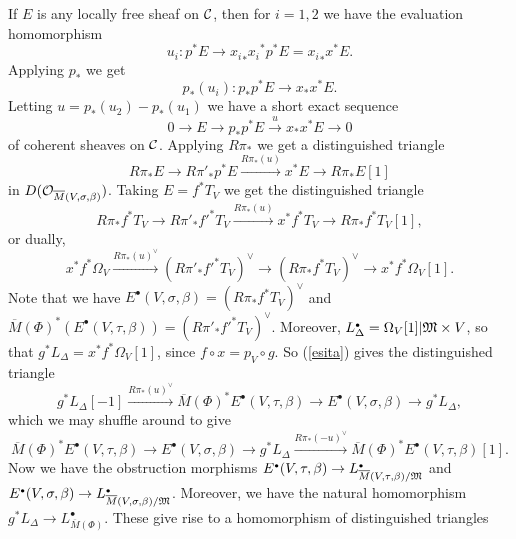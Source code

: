 \documentclass{article}
\newcommand{\dual}[1]{{{#1}^{\vee}}}
\newcommand{\upst}{^{\ast}}
\newcommand{\lst}{_{\ast}}
\newcommand{\com}{^{\scriptscriptstyle\bullet}}
\newcommand{\MM}{{\frak M}}
\renewcommand{\O}{{\cal O}}
\newcommand{\cC}{{\cal C}}
\newcommand{\resto}{{ \mid }}
\newcommand{\comp}{\mathbin{{\scriptstyle\circ}}}
\newcommand{\ol}{\overline}
\newcommand{\ses}[5]%
{0\longrightarrow#1\stackrel{#2}{ \longrightarrow}#3\stackrel{#4}{
\longrightarrow}#5\longrightarrow0}
\newcommand{\dt}[6]%
{#1\stackrel{#2}{\longrightarrow}#3 \stackrel{#4}{\longrightarrow}#5
\stackrel{#6}{\longrightarrow} #1[1]}
\begin{document}
If $E$ is any locally free sheaf on $\cC$, then for $i=1,2$ we have
the evaluation homomorphism
\[u_i:p\upst E\longrightarrow {x_i}\lst{x_i}\upst p\upst E = {x_i}\lst
x\upst E.\]
Applying $p\lst$ we get
\[p\lst(u_i):p\lst p\upst E\longrightarrow x\lst x\upst E.\]
Letting $u=p\lst(u_2)-p\lst(u_1)$ we have a short exact sequence
\[\ses{E}{}{p\lst p\upst E}{u}{x\lst x\upst E}\]
of coherent sheaves on $\cC$. Applying $R\pi\lst$ we get a
distinguished triangle
\[\dt{R\pi\lst E}{}{ R\pi'\lst p\upst E}{R\pi\lst(u)}{x\upst E}{}\]
in $D(\O_{\ol{M}(V,\sigma,\beta)})$. Taking $E=f\upst T_V$ we get the
distinguished triangle
\[\dt{R\pi\lst f\upst T_V}{}{ R\pi'\lst {f'}\upst
T_V}{R\pi\lst(u)}{x\upst f\upst T_V}{},\]
or dually,
\begin{equation}\label{esita}
\dt{x\upst f\upst \Omega_V}{\dual{R\pi\lst(u)}}{\dual{(R\pi'\lst
{f'}\upst T_V)}}{}{\dual{(R\pi\lst f\upst T_V)}}{}.
\end{equation}
Note that we have $E\com(V,\sigma,\beta)=\dual{(R\pi\lst f\upst T_V)}$
and $\ol{M}(\Phi)\upst(E\com(V,\tau,\beta))=\dual{(R\pi'\lst{f'}\upst
T_V)}$. Moreover, $L_{\Delta}\com=\Omega_V[1]\resto\MM\times V$, so
that $g\upst L_{\Delta}=x\upst f\upst \Omega_V[1]$, since $f\comp
x=p_V\comp g$. So (\ref{esita}) gives the distinguished triangle
\[{g\upst
L_{\Delta}[-1]}\stackrel{\dual{R\pi\lst(u)}}{\longrightarrow}
{\ol{M}(\Phi)\upst
E\com(V,\tau,\beta)}{\longrightarrow}{E\com(V,\sigma,\beta)}{\longrightarrow}
g\upst L_{\Delta},\]
which we may shuffle around to give
\[\dt{\ol{M}(\Phi)\upst
E\com(V,\tau,\beta)}{}{E\com(V,\sigma,\beta)}{}{g\upst
L_{\Delta}}{\dual{R\pi\lst(-u)}}.\]
Now we have the obstruction morphisms $E\com(V,\tau,\beta)\to
L\com_{\ol{M}(V,\tau,\beta)/\MM}$ and $E\com(V,\sigma,\beta)\to
L\com_{\ol{M}(V,\sigma,\beta)/\MM}$. Moreover, we have the natural
homomorphism $g\upst L_{\Delta}\to L\com_{\ol{M}(\Phi)}$. These give
rise to a homomorphism of distinguished triangles
\end{document}
